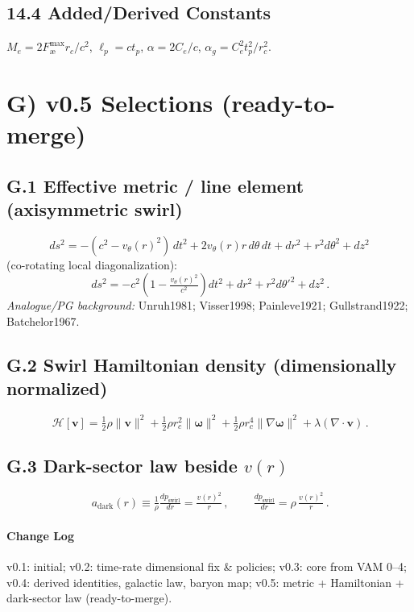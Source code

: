 \documentclass[11pt,a4paper]{article}
\begin{document}
    \subsection*{14.4 Added/Derived Constants}
    $M_e=2 F_{\text{\ae}}^{\max} r_c/c^2$, $\ell_p=c t_p$, $\alpha=2C_e/c$, $\alpha_g=C_e^{2} t_p^{2}/r_c^{2}$.

    \section*{G) v0.5 Selections (ready-to-merge)}
    \subsection*{G.1 Effective metric / line element (axisymmetric swirl)}
    \[
        \boxed{\,ds^2 = -(c^2 - v_\theta(r)^2)\,dt^2 + 2 v_\theta(r) r\, d\theta\, dt + dr^2 + r^2 d\theta^2 + dz^2\,}
    \]
    (co-rotating local diagonalization):
    \[
        \boxed{\,ds^2 = -c^2\!\left(1 - \tfrac{v_\theta(r)^2}{c^2}\right)\!dt^2 + dr^2 + r^2 d\theta'^2 + dz^2\,}.
    \]
    \emph{Analogue/PG background:} Unruh1981; Visser1998; Painleve1921; Gullstrand1922; Batchelor1967.

    \subsection*{G.2 Swirl Hamiltonian density (dimensionally normalized)}
    \[
        \boxed{\,\mathcal{H}[\bm v] = \tfrac{1}{2}\rho \lVert \bm v \rVert^2 + \tfrac{1}{2}\rho r_c^2 \lVert \bm\omega \rVert^2 + \tfrac{1}{2}\rho r_c^4 \lVert \nabla \bm\omega \rVert^2 + \lambda (\nabla\!\cdot\! \bm v)\,}.
    \]

    \subsection*{G.3 Dark-sector law beside $v(r)$}
    \[
        \boxed{\,a_{\text{dark}}(r) \equiv \tfrac{1}{\rho}\tfrac{dp_{\text{swirl}}}{dr} = \tfrac{v(r)^2}{r}\,},\qquad
        \boxed{\,\tfrac{dp_{\text{swirl}}}{dr} = \rho\,\tfrac{v(r)^2}{r}\,}.
    \]

    \paragraph*{Change Log}
    v0.1: initial; v0.2: time-rate dimensional fix \& policies; v0.3: core from VAM 0–4; v0.4: derived identities, galactic law, baryon map; v0.5: metric + Hamiltonian + dark-sector law (ready-to-merge).
\end{document}
